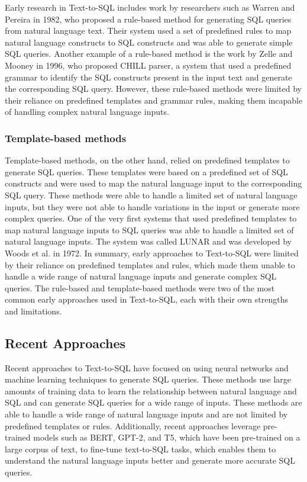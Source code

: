 Early research in Text-to-SQL includes work by researchers such as Warren and Pereira in 1982\cite{Warren1982AnEE}, who proposed a rule-based method for generating SQL queries from natural language text. Their system used a set of predefined rules to map natural language constructs to SQL constructs and was able to generate simple SQL queries. Another example of a rule-based method is the work by Zelle and Mooney in 1996, who proposed CHILL parser\cite{Zelle1996LearningTP}, a system that used a predefined grammar to identify the SQL constructs present in the input text and generate the corresponding SQL query. However, these rule-based methods were limited by their reliance on predefined templates and grammar rules, making them incapable of handling complex natural language inputs.

\subsubsection{Template-based methods}

Template-based methods, on the other hand, relied on predefined templates to generate SQL queries. These templates were based on a predefined set of SQL constructs and were used to map the natural language input to the corresponding SQL query. These methods were able to handle a limited set of natural language inputs, but they were not able to handle variations in the input or generate more complex queries. One of the very first systems that used predefined templates to map natural language inputs to SQL queries was able to handle a limited set of natural language inputs. The system was called LUNAR and was developed by Woods et al. in 1972\cite{Woods1972TheSE}.
In summary, early approaches to Text-to-SQL were limited by their reliance on predefined templates and rules, which made them unable to handle a wide range of natural language inputs and generate complex SQL queries. The rule-based and template-based methods were two of the most common early approaches used in Text-to-SQL, each with their own strengths and limitations.

\subsection{Recent Approaches}

Recent approaches to Text-to-SQL have focused on using neural networks and machine learning techniques to generate SQL queries. These methods use large amounts of training data to learn the relationship between natural language and SQL and can generate SQL queries for a wide range of inputs. These methods are able to handle a wide range of natural language inputs and are not limited by predefined templates or rules. Additionally, recent approaches leverage pre-trained models such as BERT, GPT-2, and T5, which have been pre-trained on a large corpus of text, to fine-tune text-to-SQL tasks, which enables them to understand the natural language inputs better and generate more accurate SQL queries.

